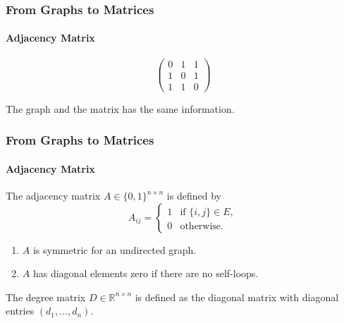 \documentclass[aspectratio=43,leqno]{beamer}
\begin{document}
\begin{frame}
  \frametitle{From Graphs to Matrices}
  \framesubtitle{Adjacency Matrix}
  
\begin{center}
\begin{displaymath}
  \begin{pmatrix} 0 & 1 & 1 \\
    1 & 0 & 1 \\
    1 & 1 & 0
  \end{pmatrix}
\end{displaymath}
\end{center}
  The graph and the matrix has the same information.
\end{frame}

\begin{frame}
  \frametitle{From Graphs to Matrices}
  \framesubtitle{Adjacency Matrix}
  
\begin{definition}
  The adjacency matrix $A \in \{0,1\}^{n\times n}$ is defined by 
\begin{displaymath}
A_{ij} =
\begin{cases}
  1 & \text{if }\{i, j\} \in E, \\
  0 & \text{otherwise}.
\end{cases}
\end{displaymath} 
\end{definition}
\pause
 
\begin{enumerate}
\item\label{item:17} $A$ is symmetric for an undirected graph. 
\item\label{item:18} $A$ has diagonal elements zero if there are no self-loops.
\end{enumerate}
\pause

\begin{definition}
  The degree matrix $D \in \mathbb{R}^{n\times n}$ is defined as the diagonal matrix with diagonal entries $(d_1, \ldots, d_n)$. 
\end{definition}

\end{frame}
\end{document}
